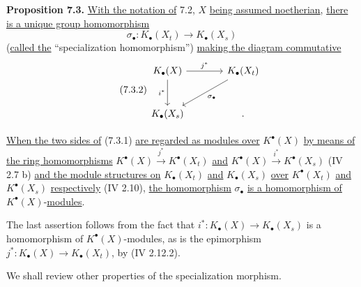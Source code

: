 \textbf{Proposition 7.3.} \uline{With the notation of} 7.2, \(X\) \uline{being assumed noetherian}, \uline{there is a unique group homomorphism}
\begin{equation}\tag{7.3.1}
 \sigma_\bullet:K_\bullet(X_t)\longrightarrow K_\bullet(X_s)
\end{equation}
(\uline{called the} ``specialization homomorphism'') \uline{making the diagram commutative}
\begin{equation}\tag{7.3.2}
\begin{tikzcd}[column sep=large,row sep=large]
K_\bullet(X) \arrow[r,"j^*"] \arrow[d,"i^*"'] & K_\bullet(X_t) \arrow[dl,"\sigma_\bullet"]\\
K_\bullet(X_s) & {.}
\end{tikzcd}
\end{equation}


\providecommand{\Kalg}{K_{\mathrm{alg}}}
\providecommand{\Gralg}{\operatorname{Gr}_{\mathrm{alg}}}
\providecommand{\Grnum}{\operatorname{Gr}_{\mathrm{num}}}
\providecommand{\Knum}{K_{\mathrm{num}}}
\providecommand{\Cl}{\operatorname{Cl}}
\providecommand{\Ch}{\operatorname{Ch}}
\providecommand{\Nm}{\operatorname{N}}
\providecommand{\colim}{\varinjlim}
\providecommand{\Hens}{\operatorname{Hens}}
\providecommand{\Spec}{\operatorname{Spec}}
\providecommand{\coker}{\operatorname{coker}}


%

\noindent \uline{When the two sides of} (7.3.1) \uline{are regarded as modules over} \(K^{\bullet}(X)\) \uline{by means of the ring homomorphisms} \(K^{\bullet}(X)\xrightarrow{j^*}K^{\bullet}(X_t)\) \uline{and} \(K^{\bullet}(X)\xrightarrow{i^*}K^{\bullet}(X_s)\) (IV 2.7 b) \uline{and the module structures on} \(K_\bullet(X_t)\) \uline{and} \(K_\bullet(X_s)\) \uline{over} \(K^{\bullet}(X_t)\) \uline{and} \(K^{\bullet}(X_s)\) \uline{respectively} (IV 2.10), \uline{the homomorphism} \(\sigma_\bullet\) \uline{is a homomorphism of} \(K^{\bullet}(X)\)-\uline{modules}.

The last assertion follows from the fact that \(i^*:K_\bullet(X)\to K_\bullet(X_s)\) is a homomorphism of \(K^{\bullet}(X)\)-modules, as is the epimorphism \(j^*:K_\bullet(X)\longrightarrow K_\bullet(X_t)\), by (IV 2.12.2).

We shall review other properties of the specialization morphism.

